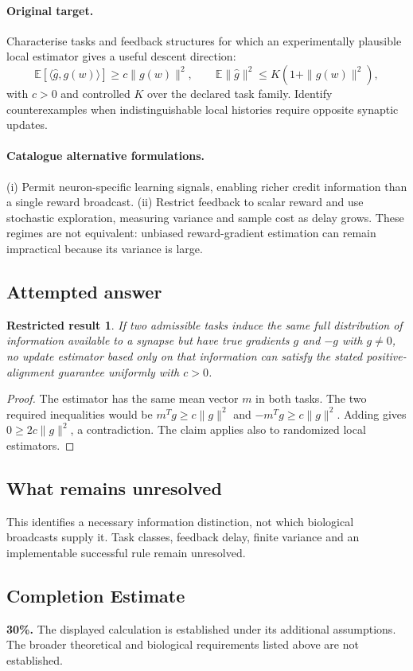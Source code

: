 \documentclass[11pt]{article}
\newcommand{\E}{\mathbb E}
\providecommand{\E}{\mathbb E}
\newtheorem{attemptresult}{Restricted result}[section]
\begin{document}
\paragraph{Original target.}
Characterise tasks and feedback structures for which an experimentally plausible local estimator gives a useful descent direction:
\[
\E[\langle\widehat g,g(w)\rangle]\geq c\|g(w)\|^2,
\qquad
\E\|\widehat g\|^2\leq K(1+\|g(w)\|^2),
\]
with $c>0$ and controlled $K$ over the declared task family. Identify counterexamples when indistinguishable local histories require opposite synaptic updates.
\paragraph{Catalogue alternative formulations.}
(i) Permit neuron-specific learning signals, enabling richer credit information than a single reward broadcast. (ii) Restrict feedback to scalar reward and use stochastic exploration, measuring variance and sample cost as delay grows. These regimes are not equivalent: unbiased reward-gradient estimation can remain impractical because its variance is large.
\subsection{Attempted answer}
\begin{attemptresult}
If two admissible tasks induce the same full distribution of information available to a synapse but have true gradients $g$ and $-g$ with $g\ne0$, no update estimator based only on that information can satisfy the stated positive-alignment guarantee uniformly with $c>0$.
\end{attemptresult}
\begin{proof}
The estimator has the same mean vector $m$ in both tasks. The two required inequalities would be $m^Tg\geq c\|g\|^2$ and $-m^Tg\geq c\|g\|^2$. Adding gives $0\geq2c\|g\|^2$, a contradiction. The claim applies also to randomized local estimators.
\end{proof}
\subsection{What remains unresolved}
This identifies a necessary information distinction, not which biological broadcasts supply it. Task classes, feedback delay, finite variance and an implementable successful rule remain unresolved.
\subsection{Completion Estimate}
\textbf{30\%.} The displayed calculation is established under its additional assumptions. The broader theoretical and biological requirements listed above are not established.
\end{document}
